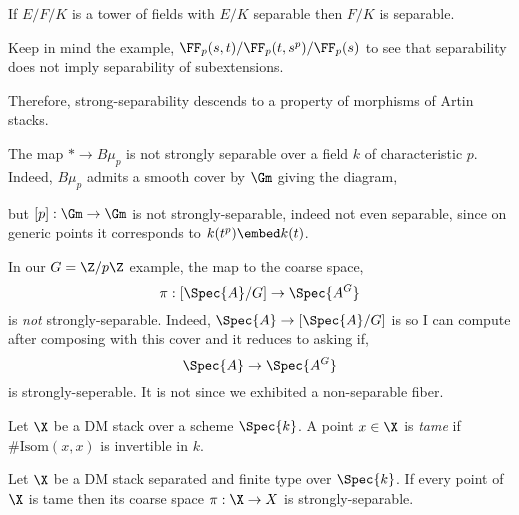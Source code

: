 \documentclass[12pt]{article}
\begin{document}
\begin{lemma}
If $E/F/K$ is a tower of fields with $E/K$ separable then $F/K$ is separable. 
\end{lemma}

\begin{rmk}
Keep in mind the example, $\FF_p(s,t) / \FF_p(t, s^p) / \FF_p(s)$ to see that separability does not imply separability of subextensions. 
\end{rmk}

\begin{rmk}
Therefore, strong-separability descends to a property of morphisms of Artin stacks.
\end{rmk}

\begin{example}
The map $* \to B \mu_p$ is not strongly separable over a field $k$ of characteristic $p$. Indeed, $B \mu_p$ admits a smooth cover by $\Gm$ giving the diagram,
\begin{center}
\end{center}
but $[p] : \Gm \to \Gm$ is not strongly-separable, indeed not even separable, since on generic points it corresponds to $k(t^p) \embed k(t)$. 
\end{example}

\begin{example}
In our $G = \Z / p \Z$ example, the map to the coarse space,
\[ \pi : [\Spec{A} / G] \to \Spec{A^G} \]
is \textit{not} strongly-separable. Indeed, $\Spec{A} \to [\Spec{A} / G]$ is \etale so I can compute after composing with this cover and it reduces to asking if,
\[ \Spec{A} \to \Spec{A^G} \]
is strongly-seperable. It is not since we exhibited a non-separable fiber.
\end{example}

\begin{defn}
Let $\X$ be a DM stack over a scheme $\Spec{k}$. A point $x \in \X$ is \textit{tame} if $\# \mathrm{Isom}(x,x)$ is invertible in $k$.
\end{defn}

\begin{prop}
Let $\X$ be a DM stack separated and finite type over $\Spec{k}$. If every point of $\X$ is tame then its coarse space $\pi : \X \to X$ is strongly-separable.
\end{prop}
\end{document}
